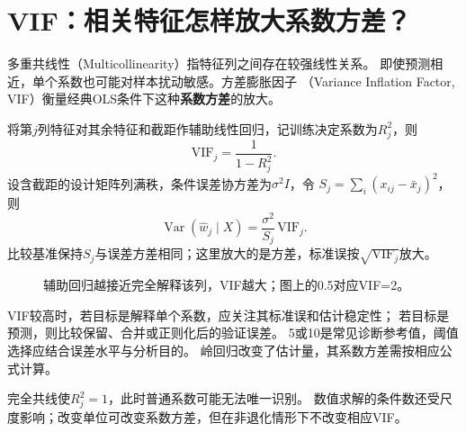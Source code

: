 \section{VIF：相关特征怎样放大系数方差？}
\label{sec:linear-vif}
多重共线性（Multicollinearity）指特征列之间存在较强线性关系。
即使预测相近，单个系数也可能对样本扰动敏感。方差膨胀因子
（Variance Inflation Factor, VIF）衡量经典OLS条件下这种\textbf{系数方差}的放大。

将第$j$列特征对其余特征和截距作辅助线性回归，记训练决定系数为$R_j^2$，则
\[
 \mathrm{VIF}_j=\frac1{1-R_j^2}.
\]
设含截距的设计矩阵列满秩，条件误差协方差为$\sigma^2 I$，令
$S_j=\sum_i(x_{ij}-\bar x_j)^2$，则
\[
 \operatorname{Var}(\hat w_j\mid X)=\frac{\sigma^2}{S_j}\,\mathrm{VIF}_j.
\]
比较基准保持$S_j$与误差方差相同；这里放大的是方差，标准误按$\sqrt{\mathrm{VIF}_j}$放大。

\begin{figure}[htbp]
\centering
\caption{辅助回归越接近完全解释该列，VIF越大；图上的0.5对应VIF=2。}
\par\smallskip
{}
\end{figure}

VIF较高时，若目标是解释单个系数，应关注其标准误和估计稳定性；
若目标是预测，则比较保留、合并或正则化后的验证误差。
5或10是常见诊断参考值，阈值选择应结合误差水平与分析目的。
岭回归改变了估计量，其系数方差需按相应公式计算。

完全共线使$R_j^2=1$，此时普通系数可能无法唯一识别。
数值求解的条件数还受尺度影响；改变单位可改变系数方差，但在非退化情形下不改变相应VIF。
